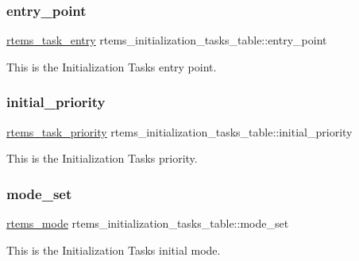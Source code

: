 \subsubsection{\texorpdfstring{entry\_point}{entry\_point}}
{\footnotesize\ttfamily \mbox{\hyperlink{group__ClassicTasks_ga3232e2350ecd8d85855ab1f6ec186828}{rtems\+\_\+task\+\_\+entry}} rtems\+\_\+initialization\+\_\+tasks\+\_\+table\+::entry\+\_\+point}

This is the Initialization Task\textquotesingle{}s entry point. \mbox{\label{structrtems__initialization__tasks__table_a31446a9f0943284b127c2dd97d580bad}} 
\subsubsection{\texorpdfstring{initial\_priority}{initial\_priority}}
{\footnotesize\ttfamily \mbox{\hyperlink{group__ClassicTasks_gaa80a0c0938307d1e99d0eb5fee765b47}{rtems\+\_\+task\+\_\+priority}} rtems\+\_\+initialization\+\_\+tasks\+\_\+table\+::initial\+\_\+priority}

This is the Initialization Task\textquotesingle{}s priority. \mbox{\label{structrtems__initialization__tasks__table_aabad7c00e2e614998b7f51b1b5e0f4be}} 
\subsubsection{\texorpdfstring{mode\_set}{mode\_set}}
{\footnotesize\ttfamily \mbox{\hyperlink{group__ClassicModes_ga8d46a41a837840dc97336fdcd20e4f68}{rtems\+\_\+mode}} rtems\+\_\+initialization\+\_\+tasks\+\_\+table\+::mode\+\_\+set}

This is the Initialization Task\textquotesingle{}s initial mode. \mbox{\label{structrtems__initialization__tasks__table_a3500cd16dc2ae210a681a2bad986d630}} 

